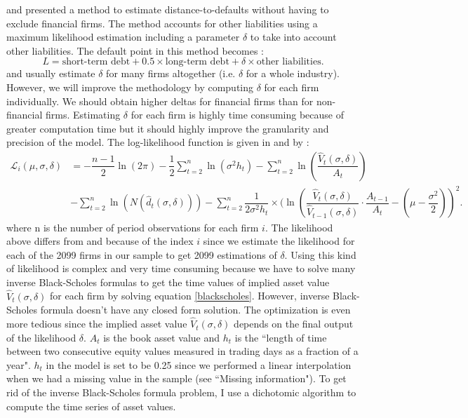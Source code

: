 \citet{Duan2012} and \citet{Duan2012DTD} presented a method to estimate distance-to-defaults without having to exclude financial firms. The method accounts for other liabilities using a maximum likelihood estimation including a parameter $\delta$ to take into account other liabilities. 
The default point in this method becomes :
\begin{equation}
L = \text{short-term debt} + 0.5 \times \text{long-term debt} + \delta \times \text{other liabilities}.
\end{equation}
\citet{Duan2012} and \citet{Duan2012DTD} usually estimate $\delta$ for many firms altogether (i.e. $\delta$ for a whole industry). However, we will improve the methodology by computing $\delta$ for each firm individually. We should obtain higher deltas for financial firms than for non-financial firms. Estimating $\delta$ for each firm is highly time consuming because of greater computation time but it should highly improve the granularity and precision of the model.
The log-likelihood function is given in \citet{Duan2012} and \citet{Duan2012DTD} by :
\begin{align*}
\mathcal{L}_i(\mu,\sigma,\delta) &= -\dfrac{n-1}{2}\ln(2\pi) - \dfrac{1}{2}\sum_{t=2}^n \ln(\sigma^2h_t) - \sum_{t=2}^n \ln(\dfrac{\hat{V}_t(\sigma,\delta)}{A_t}) \\
&-\sum_{t=2}^n \ln(N(\hat{d}_t(\sigma,\delta))) -\sum_{t=2}^n \dfrac{1}{2\sigma^2h_t} \times (\ln(\dfrac{\hat{V}_t(\sigma,\delta)}{\hat{V}_{t-1}(\sigma,\delta)}\cdot \dfrac{A_{t-1}}{A_t}-(\mu - \dfrac{\sigma^2}{2}))^2.
\end{align*}
where n is the number of period observations for each firm $i$. The likelihood above differs from \citet{Duan2012} and \citet{Duan2012DTD} because of the index $i$ since we estimate the likelihood for each of the 2099 firms in our sample to get 2099 estimations of $\delta$. Using this kind of likelihood is complex and very time consuming because we have to solve many inverse Black-Scholes formulas to get the time values of implied asset value $\hat{V}_t(\sigma,\delta)$ for each firm by solving equation \ref{blackscholes}. However, inverse Black-Scholes formula doesn't have any closed form solution. The optimization is even more tedious since the implied asset value $\hat{V}_t(\sigma,\delta)$ depends on the final output of the likelihood $\delta$. $A_t$ is the book asset value and $h_t$ is the ``length of time between two consecutive equity values measured in trading days as a fraction of a year". $h_t$ in the model is set to be 0.25 since we performed a linear interpolation when we had a missing value in the sample (see ``Missing information"). To get rid of the inverse Black-Scholes formula problem, I use a dichotomic algorithm to compute the time series of asset values.\\



